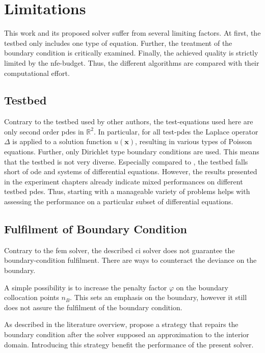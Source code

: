 \documentclass[./\jobname.tex]{subfiles}
\begin{document}
\chapter{Limitations}
This work and its proposed solver suffer from several limiting factors. At first, the testbed only includes one type of equation. Further, the treatment of the boundary condition is critically examined. Finally, the achieved quality is strictly limited by the \gls{nfe}-budget. Thus, the different algorithms are compared with their computational effort. 

\section{Testbed}

Contrary to the testbed used by other authors, the test-equations used here are only second order \gls{pde}s in $\mathbb{R}^2$. In particular, for all test-\gls{pde}s the Laplace operator $\Delta$ is applied to a solution function $u(\mathbf{x})$, resulting in various types of Poisson equations. Further, only Dirichlet type boundary conditions are used. This means that the testbed is not very diverse. Especially compared to \cite{chaquet_using_2019}, the testbed falls short of \gls{ode} and systems of differential equations. However, the results presented in the experiment chapters already indicate mixed performances on different testbed \gls{pde}s. Thus, starting with a manageable variety of problems helps with assessing the performance on a particular subset of differential equations.  


\section{Fulfilment of Boundary Condition}
Contrary to the \gls{fem} solver, the described \gls{ci} solver does not guarantee the boundary-condition fulfilment. There are ways to counteract the deviance on the boundary. 

A simple possibility is to increase the penalty factor $\varphi$ on the boundary collocation points $n_B$. This sets an emphasis on the boundary, however it still does not assure the fulfilment of the boundary condition.

As described in the literature overview, \cite{kirstukas_hybrid_2005} propose a strategy that repairs the boundary condition after the solver supposed an approximation to the interior domain. Introducing this strategy benefit the performance of the present solver. 
\end{document}
